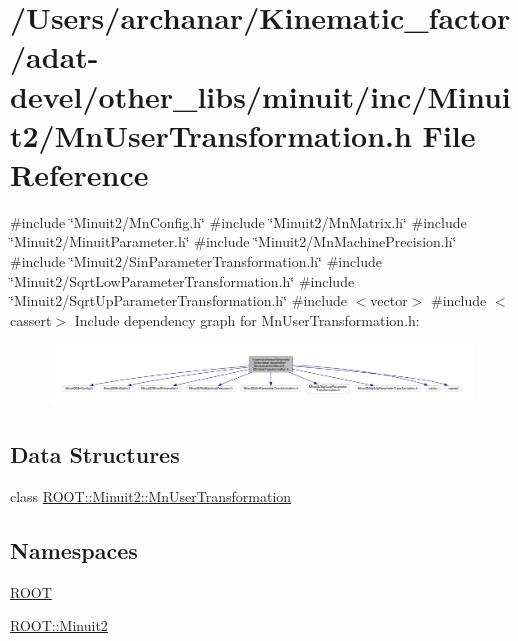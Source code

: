 \hypertarget{adat-devel_2other__libs_2minuit_2inc_2Minuit2_2MnUserTransformation_8h}{}\section{/\+Users/archanar/\+Kinematic\+\_\+factor/adat-\/devel/other\+\_\+libs/minuit/inc/\+Minuit2/\+Mn\+User\+Transformation.h File Reference}
\label{adat-devel_2other__libs_2minuit_2inc_2Minuit2_2MnUserTransformation_8h}
{\ttfamily \#include \char`\"{}Minuit2/\+Mn\+Config.\+h\char`\"{}}\newline
{\ttfamily \#include \char`\"{}Minuit2/\+Mn\+Matrix.\+h\char`\"{}}\newline
{\ttfamily \#include \char`\"{}Minuit2/\+Minuit\+Parameter.\+h\char`\"{}}\newline
{\ttfamily \#include \char`\"{}Minuit2/\+Mn\+Machine\+Precision.\+h\char`\"{}}\newline
{\ttfamily \#include \char`\"{}Minuit2/\+Sin\+Parameter\+Transformation.\+h\char`\"{}}\newline
{\ttfamily \#include \char`\"{}Minuit2/\+Sqrt\+Low\+Parameter\+Transformation.\+h\char`\"{}}\newline
{\ttfamily \#include \char`\"{}Minuit2/\+Sqrt\+Up\+Parameter\+Transformation.\+h\char`\"{}}\newline
{\ttfamily \#include $<$vector$>$}\newline
{\ttfamily \#include $<$cassert$>$}\newline
Include dependency graph for Mn\+User\+Transformation.\+h\+:
\nopagebreak
\begin{figure}[H]
\begin{center}
\leavevmode
\includegraphics[width=350pt]{d9/d2a/adat-devel_2other__libs_2minuit_2inc_2Minuit2_2MnUserTransformation_8h__incl}
\end{center}
\end{figure}
\subsection*{Data Structures}
\begin{DoxyCompactItemize}
\item 
class \mbox{\hyperlink{classROOT_1_1Minuit2_1_1MnUserTransformation}{R\+O\+O\+T\+::\+Minuit2\+::\+Mn\+User\+Transformation}}
\end{DoxyCompactItemize}
\subsection*{Namespaces}
\begin{DoxyCompactItemize}
\item 
 \mbox{\hyperlink{namespaceROOT}{R\+O\+OT}}
\item 
 \mbox{\hyperlink{namespaceROOT_1_1Minuit2}{R\+O\+O\+T\+::\+Minuit2}}
\end{DoxyCompactItemize}
